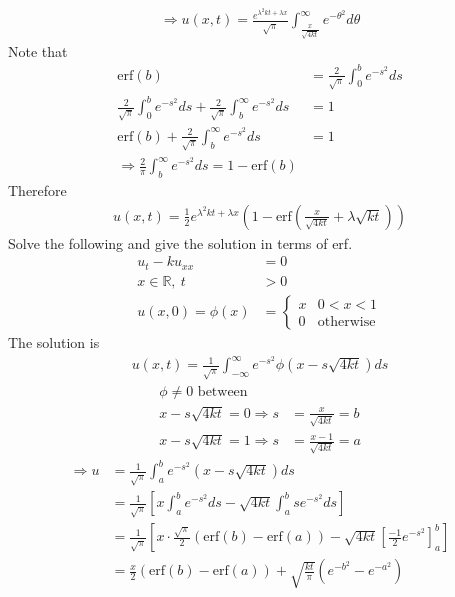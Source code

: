 \documentclass[12pt, letterpaper]{article}
\begin{document}
\begin{align*}
    \Rightarrow u(x,t) = \frac{e^{\lambda^2kt+\lambda x}}{\sqrt \pi} \int_{\frac{x}{\sqrt{4kt}}}^{\infty}e^{-\theta^2}d\theta
\end{align*}
Note that 
\begin{align*}
    \text{erf}(b) &= \frac{2}{\sqrt \pi} \int_{0}^{b}e^{-s^2}ds \\
    \frac{2}{\sqrt \pi} \int_{0}^{b} e^{-s^2} ds + \frac{2}{\sqrt{\pi}} \int_{b}^{\infty}e^{-s^2}ds &= 1 \\
    \text{erf}(b) + \frac{2}{\sqrt{\pi}} \int_{b}^{\infty} e^{-s^2}ds &= 1 \\
    \Rightarrow \frac{2}{\pi} \int_{b}^{\infty} e^{-s^2} ds = 1 - \text{erf}(b)
\end{align*}
Therefore 
\begin{align*}
    u(x,t) = \frac{1}{2} e^{\lambda^2kt+\lambda x}\left(1-\text{erf}\left(\frac{x}{\sqrt{4kt}}+\lambda\sqrt{kt}\right)\right)
\end{align*}
 Solve the following and give the solution in terms of erf.
\begin{align*}
    u_t - ku_{xx} &= 0 \\
    x\in \mathbb{R},\ t &> 0 \\
    u(x,0) = \phi(x) &= \begin{cases}
        x & 0 < x < 1 \\
        0 & \text{otherwise}
    \end{cases} 
\end{align*}
The solution is 
\begin{align*}
    u(x,t) = \frac{1}{\sqrt{\pi}} \int_{-\infty}^{\infty} e^{-s^2} \phi ( x - s\sqrt{4kt}) ds 
\end{align*}
\begin{align*}
    \phi \ne 0 \text{ between} &\\
    x - s \sqrt{4kt} = 0 \Rightarrow s &= \frac{x}{\sqrt{4kt}} = b \\
    x - s \sqrt{4kt} = 1 \Rightarrow s &= \frac{x-1}{\sqrt{4kt}} = a
\end{align*}
\begin{align*}
    \Rightarrow u &= \frac{1}{\sqrt{\pi}} \int_{a}^{b} e^{-s^2} (x - s\sqrt{4kt})ds \\
    &= \frac{1}{\sqrt{\pi}} \left[x\int_{a}^{b} e^{-s^2} ds - \sqrt{4kt} \int_{a}^{b}se^{-s^2} ds  \right] \\
    &= \frac{1}{\sqrt{\pi}} \left[x\cdot \frac{\sqrt{\pi}}{2}(\text{erf}(b)-\text{erf}(a)) - \sqrt{4kt}[\frac{-1}{2}e^{-s^2}]^b_a \right] \\
    &= \frac{x}{2}(\text{erf}(b)-\text{erf}(a)) + \sqrt{\frac{kt}{\pi}}(e^{-b^2} - e^{-a^2})
\end{align*}
\end{document}

